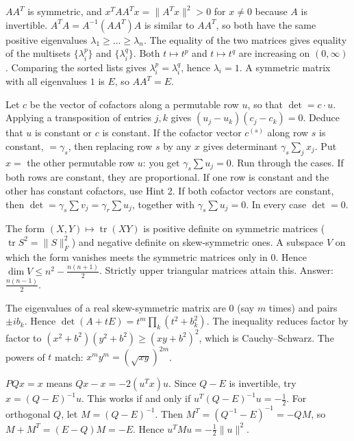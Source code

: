 \documentclass[11pt,a4paper]{article}
\begin{document}

\(AA^T\) is symmetric, and \(x^TAA^Tx=\|A^Tx\|^2>0\) for \(x\ne0\) because \(A\) is invertible.
\(A^TA=A^{-1}(AA^T)A\) is similar to \(AA^T\), so both have the same positive eigenvalues \(\lambda_1\ge\dots\ge\lambda_n\). The equality of the two matrices gives equality of the multisets \(\{\lambda_i^p\}\) and \(\{\lambda_i^q\}\).
Both \(t\mapsto t^p\) and \(t\mapsto t^q\) are increasing on \((0,\infty)\). Comparing the sorted lists gives \(\lambda_i^p=\lambda_i^q\), hence \(\lambda_i=1\). A symmetric matrix with all eigenvalues \(1\) is \(E\), so \(AA^T=E\).

Let \(c\) be the vector of cofactors along a permutable row \(u\), so that \(\det=c\cdot u\). Applying a transposition of entries \(j,k\) gives \((u_j-u_k)(c_j-c_k)=0\). Deduce that \(u\) is constant or \(c\) is constant.
If the cofactor vector \(c^{(s)}\) along row \(s\) is constant, \(=\gamma_s\), then replacing row \(s\) by any \(x\) gives determinant \(\gamma_s\sum_jx_j\). Put \(x=\) the other permutable row \(u\): you get \(\gamma_s\sum u_j=0\).
Run through the cases. If both rows are constant, they are proportional. If one row is constant and the other has constant cofactors, use Hint 2. If both cofactor vectors are constant, then \(\det=\gamma_s\sum v_j=\gamma_r\sum u_j\), together with \(\gamma_s\sum u_j=0\). In every case \(\det=0\).

The form \((X,Y)\mapsto\operatorname{tr}(XY)\) is positive definite on symmetric matrices (\(\operatorname{tr}S^2=\|S\|_F^2\)) and negative definite on skew-symmetric ones.
A subspace \(V\) on which the form vanishes meets the symmetric matrices only in \(0\). Hence \(\dim V\le n^2-\frac{n(n+1)}2\). Strictly upper triangular matrices attain this. Answer: \(\frac{n(n-1)}2\).

The eigenvalues of a real skew-symmetric matrix are \(0\) (say \(m\) times) and pairs \(\pm ib_k\). Hence \(\det(A+tE)=t^m\prod_k(t^2+b_k^2)\).
The inequality reduces factor by factor to \((x^2+b^2)(y^2+b^2)\ge(xy+b^2)^2\), which is Cauchy--Schwarz. The powers of \(t\) match: \(x^my^m=(\sqrt{xy})^{2m}\).

\(PQx=x\) means \(Qx-x=-2(u^Tx)u\). Since \(Q-E\) is invertible, try \(x=(Q-E)^{-1}u\). This works if and only if \(u^T(Q-E)^{-1}u=-\frac12\).
For orthogonal \(Q\), let \(M=(Q-E)^{-1}\). Then \(M^T=(Q^{-1}-E)^{-1}=-QM\), so \(M+M^T=(E-Q)M=-E\). Hence \(u^TMu=-\frac12\|u\|^2\).
\end{document}
